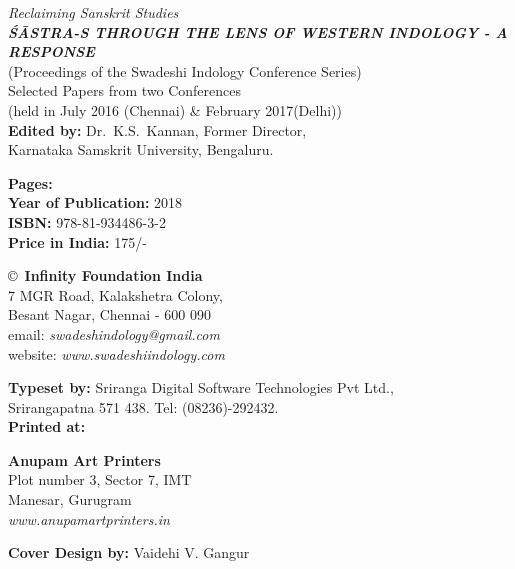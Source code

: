\thispagestyle{empty}
\noindent
{\fontsize{9}{11}\selectfont\sl Reclaiming Sanskrit Studies}\\
{\sl\bfseries ŚĀSTRA-S THROUGH THE LENS OF WESTERN INDOLOGY - A RESPONSE}\\ 
(Proceedings of the Swadeshi Indology Conference Series)\\
Selected Papers from two Conferences\\ 
(held in July 2016 (Chennai) \& February 2017(Delhi))\\
{\bf Edited by:} Dr.\ K.S.\ Kannan, Former Director,\\ 
Karnataka Samskrit University, Bengaluru.
\vfill

\noindent
{\bf Pages:} \pageref{bookend}\\
{\bf Year of Publication:} 2018\\
{\bf ISBN:} 978-81-934486-3-2\\
{\bf Price in India:} 175/-
\vfill

\noindent
\copyright\ {\bf Infinity Foundation India}\\ 
7 MGR Road, Kalakshetra Colony,\\ 
Besant Nagar, Chennai - 600 090\\
email: {\sl swadeshindology@gmail.com}\\
website: {\sl www.swadeshiindology.com} 
\vfill

\noindent
{\bf Typeset by:} Sriranga Digital Software Technologies Pvt Ltd.,\\ 
Srirangapatna 571 438. Tel: (08236)-292432.\\

\noindent
{\bf Printed at:} 

\noindent
{\bf Anupam Art Printers}\\
Plot number 3, Sector 7, IMT\\
Manesar, Gurugram\\
{\sl www.anupamartprinters.in}
\noindent

\bigskip

{\bf Cover Design by:} Vaidehi V. Gangur
